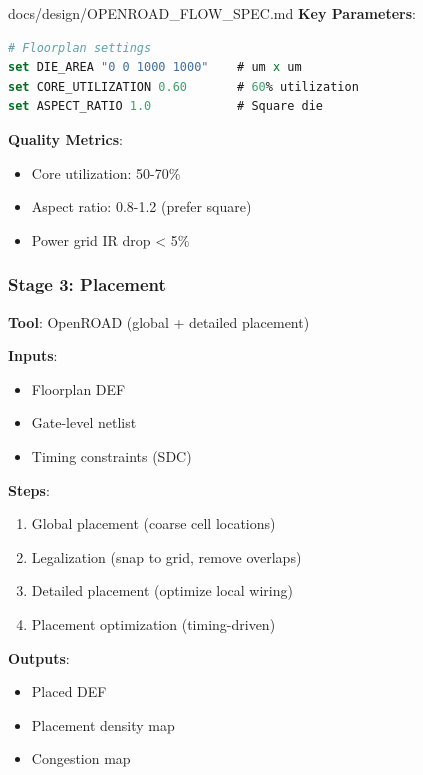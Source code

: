 \begin{relocated}{docs/design/OPENROAD_FLOW_SPEC.md}
\textbf{Key Parameters}:

\begin{lstlisting}[language=tcl]
# Floorplan settings
set DIE_AREA "0 0 1000 1000"    # um x um
set CORE_UTILIZATION 0.60       # 60% utilization
set ASPECT_RATIO 1.0            # Square die
\end{lstlisting}

\textbf{Quality Metrics}:

\begin{itemize}
\tightlist
\item
  Core utilization: 50-70\%
\item
  Aspect ratio: 0.8-1.2 (prefer square)
\item
  Power grid IR drop \textless{} 5\%
\end{itemize}

\subsubsection{Stage 3: Placement}\label{tm:pd:openroad-flow:stage-3-placement}

\textbf{Tool}: OpenROAD (global + detailed placement)

\textbf{Inputs}:

\begin{itemize}
\tightlist
\item
  Floorplan DEF
\item
  Gate-level netlist
\item
  Timing constraints (SDC)
\end{itemize}

\textbf{Steps}:

\begin{enumerate}
\def\labelenumi{\arabic{enumi}.}
\tightlist
\item
  Global placement (coarse cell locations)
\item
  Legalization (snap to grid, remove overlaps)
\item
  Detailed placement (optimize local wiring)
\item
  Placement optimization (timing-driven)
\end{enumerate}

\textbf{Outputs}:

\begin{itemize}
\tightlist
\item
  Placed DEF
\item
  Placement density map
\item
  Congestion map
\end{itemize}


\end{relocated}
